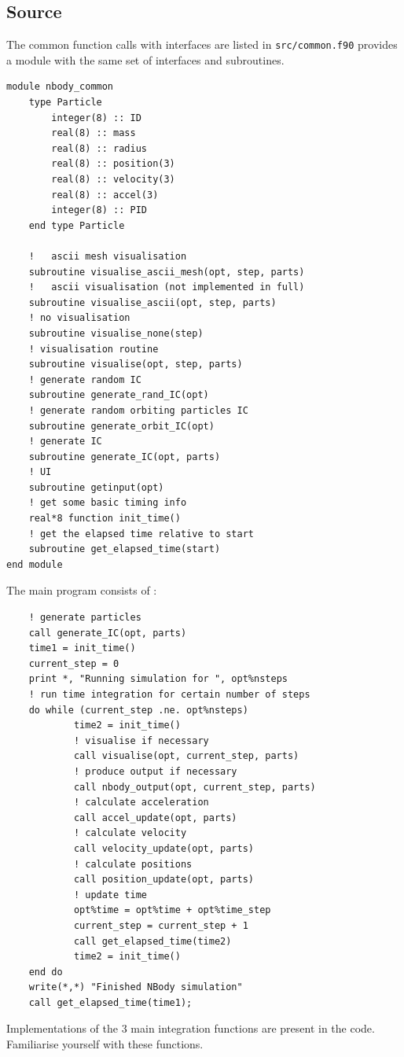 \subsection{Source}
The common function calls with interfaces are listed in \texttt{src/common.f90} provides a module with the same set of interfaces and subroutines. 
\begin{center}
\begin{minipage}{0.95\textwidth}
\small
\begin{verbatim}
module nbody_common
    type Particle
        integer(8) :: ID
        real(8) :: mass
        real(8) :: radius
        real(8) :: position(3)
        real(8) :: velocity(3)
        real(8) :: accel(3)
        integer(8) :: PID
    end type Particle

    !   ascii mesh visualisation
    subroutine visualise_ascii_mesh(opt, step, parts)
    !   ascii visualisation (not implemented in full)
    subroutine visualise_ascii(opt, step, parts)
    ! no visualisation
    subroutine visualise_none(step)
    ! visualisation routine
    subroutine visualise(opt, step, parts)
    ! generate random IC
    subroutine generate_rand_IC(opt)
    ! generate random orbiting particles IC
    subroutine generate_orbit_IC(opt)
    ! generate IC
    subroutine generate_IC(opt, parts)
    ! UI
    subroutine getinput(opt)
    ! get some basic timing info
    real*8 function init_time()
    ! get the elapsed time relative to start
    subroutine get_elapsed_time(start)
end module
\end{verbatim}
\end{minipage}
\end{center}

\newpage
The main program consists of : 
\begin{center}
\begin{minipage}{0.95\textwidth}
\begin{verbatim}
    ! generate particles 
    call generate_IC(opt, parts)
    time1 = init_time()
    current_step = 0
    print *, "Running simulation for ", opt%nsteps
    ! run time integration for certain number of steps
    do while (current_step .ne. opt%nsteps)
            time2 = init_time()
            ! visualise if necessary 
            call visualise(opt, current_step, parts)
            ! produce output if necessary 
            call nbody_output(opt, current_step, parts)
            ! calculate acceleration 
            call accel_update(opt, parts)
            ! calculate velocity 
            call velocity_update(opt, parts)
            ! calculate positions 
            call position_update(opt, parts)
            ! update time 
            opt%time = opt%time + opt%time_step
            current_step = current_step + 1
            call get_elapsed_time(time2)
            time2 = init_time()
    end do 
    write(*,*) "Finished NBody simulation"
    call get_elapsed_time(time1);
\end{verbatim}
\end{minipage}
\end{center}
Implementations of the 3 main integration functions are present in the code. Familiarise yourself with these functions. 

